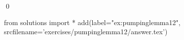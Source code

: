 
\begin{ex} 
  \label{ex:pumpinglemma12}
  
  \qed
\end{ex} 
\begin{python0}
from solutions import *
add(label="ex:pumpinglemma12",
    srcfilename='exercises/pumpinglemma12/answer.tex') 
\end{python0}
